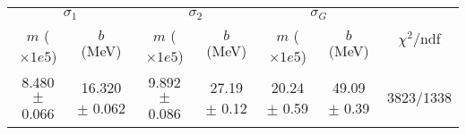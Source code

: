 \begin{tabular}{cc|cc|cc||c}
\multicolumn{2}{c|}{$\sigma_1$} & \multicolumn{2}{|c}{$\sigma_2$} & \multicolumn{2}{|c}{$\sigma_G$}  & \multirow{2}{*}{$\chi^2/$ndf}\\
$m$ ($\times1e5$) & $b$ (MeV) & $m$ ($\times1e5$) & $b$ (MeV) & $m$ ($\times1e5$) & $b$ (MeV) & \\
\hline
8.480 $\pm$ 0.066 & 16.320 $\pm$ 0.062 & 9.892 $\pm$ 0.086 & 27.19 $\pm$ 0.12 & 20.24 $\pm$ 0.59 & 49.09 $\pm$ 0.39 & 3823/1338\\
\end{tabular}
